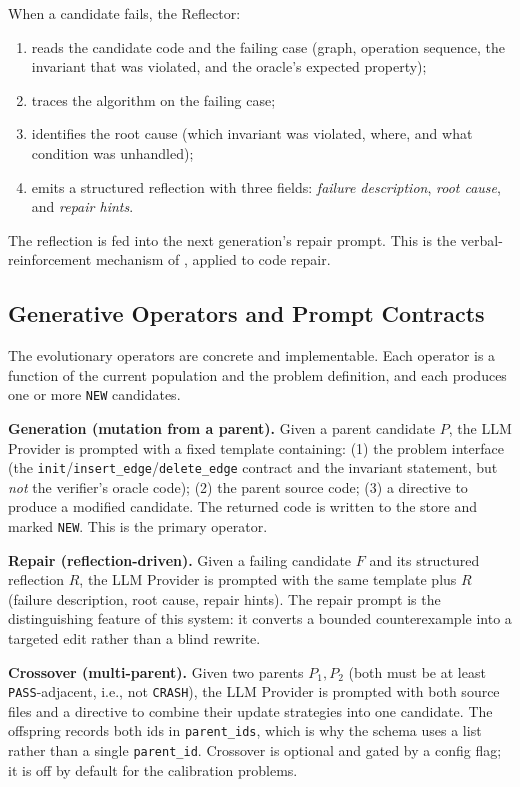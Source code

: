 \documentclass[12pt,a4paper]{article}
\begin{document}
When a candidate fails, the Reflector:
\begin{enumerate}[noitemsep]
  \item reads the candidate code and the failing case (graph, operation sequence, the invariant that was violated, and the oracle's expected property);
  \item traces the algorithm on the failing case;
  \item identifies the root cause (which invariant was violated, where, and what condition was unhandled);
  \item emits a structured reflection with three fields: \emph{failure description}, \emph{root cause}, and \emph{repair hints}.
\end{enumerate}
The reflection is fed into the next generation's repair prompt. This is the verbal-reinforcement mechanism of \cite{reflexion2023}, applied to code repair.

\subsection{Generative Operators and Prompt Contracts}

The evolutionary operators are concrete and implementable. Each operator is a function of the current population and the problem definition, and each produces one or more \texttt{NEW} candidates.

\textbf{Generation (mutation from a parent).} Given a parent candidate $P$, the LLM Provider is prompted with a fixed template containing: (1) the problem interface (the \texttt{init}/\texttt{insert\_edge}/\texttt{delete\_edge} contract and the invariant statement, but \emph{not} the verifier's oracle code); (2) the parent source code; (3) a directive to produce a modified candidate. The returned code is written to the store and marked \texttt{NEW}. This is the primary operator.

\textbf{Repair (reflection-driven).} Given a failing candidate $F$ and its structured reflection $R$, the LLM Provider is prompted with the same template plus $R$ (failure description, root cause, repair hints). The repair prompt is the distinguishing feature of this system: it converts a bounded counterexample into a targeted edit rather than a blind rewrite.

\textbf{Crossover (multi-parent).} Given two parents $P_1, P_2$ (both must be at least \texttt{PASS}-adjacent, i.e., not \texttt{CRASH}), the LLM Provider is prompted with both source files and a directive to combine their update strategies into one candidate. The offspring records both ids in \texttt{parent\_ids}, which is why the schema uses a list rather than a single \texttt{parent\_id}. Crossover is optional and gated by a config flag; it is off by default for the calibration problems.
\end{document}
